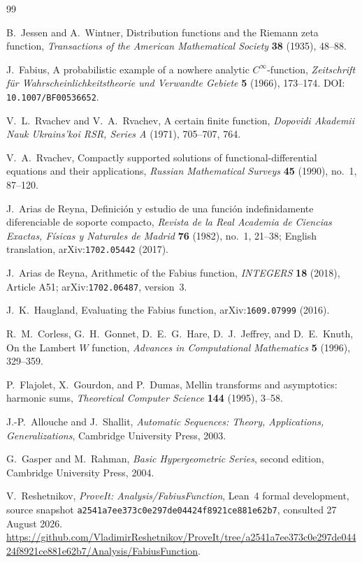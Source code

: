 \documentclass[11pt,oneside]{article}
\theoremstyle{definition}
\theoremstyle{remark}
\newcommand{\1}{\mathbf 1}
\begin{document}
\begin{thebibliography}{99}

B.~Jessen and A.~Wintner,
\newblock Distribution functions and the Riemann zeta function,
\newblock \emph{Transactions of the American Mathematical Society} \textbf{38} (1935),
48--88.

J.~Fabius,
\newblock A probabilistic example of a nowhere analytic $C^\infty$-function,
\newblock \emph{Zeitschrift f\"ur Wahrscheinlichkeitstheorie und Verwandte Gebiete}
\textbf{5} (1966), 173--174.
\newblock DOI: \nolinkurl{10.1007/BF00536652}.

V.~L.~Rvachev and V.~A.~Rvachev,
\newblock A certain finite function,
\newblock \emph{Dopovidi Akademii Nauk Ukrains'koi RSR, Series A} (1971), 705--707, 764.

V.~A.~Rvachev,
\newblock Compactly supported solutions of functional-differential equations and their
applications,
\newblock \emph{Russian Mathematical Surveys} \textbf{45} (1990), no.~1, 87--120.

J.~Arias de Reyna,
\newblock Definici\'on y estudio de una funci\'on indefinidamente diferenciable de soporte
compacto,
\newblock \emph{Revista de la Real Academia de Ciencias Exactas, F\'isicas y Naturales de
Madrid} \textbf{76} (1982), no.~1, 21--38;
English translation, arXiv:\nolinkurl{1702.05442} (2017).

J.~Arias de Reyna,
\newblock Arithmetic of the Fabius function,
\newblock \emph{INTEGERS} \textbf{18} (2018), Article A51;
arXiv:\nolinkurl{1702.06487}, version~3.

J.~K.~Haugland,
\newblock Evaluating the Fabius function,
\newblock arXiv:\nolinkurl{1609.07999} (2016).

R.~M.~Corless, G.~H.~Gonnet, D.~E.~G.~Hare, D.~J.~Jeffrey, and D.~E.~Knuth,
\newblock On the Lambert $W$ function,
\newblock \emph{Advances in Computational Mathematics} \textbf{5} (1996), 329--359.

P.~Flajolet, X.~Gourdon, and P.~Dumas,
\newblock Mellin transforms and asymptotics: harmonic sums,
\newblock \emph{Theoretical Computer Science} \textbf{144} (1995), 3--58.

J.-P.~Allouche and J.~Shallit,
\newblock \emph{Automatic Sequences: Theory, Applications, Generalizations},
\newblock Cambridge University Press, 2003.

G.~Gasper and M.~Rahman,
\newblock \emph{Basic Hypergeometric Series}, second edition,
\newblock Cambridge University Press, 2004.

V.~Reshetnikov,
\newblock \emph{ProveIt: Analysis/FabiusFunction}, Lean~4 formal development,
source snapshot \texttt{a2541a7ee373c0e297de04424f8921ce881e62b7}, consulted 27 August 2026.
\newblock \url{https://github.com/VladimirReshetnikov/ProveIt/tree/a2541a7ee373c0e297de04424f8921ce881e62b7/Analysis/FabiusFunction}.

\end{thebibliography}
\end{document}
